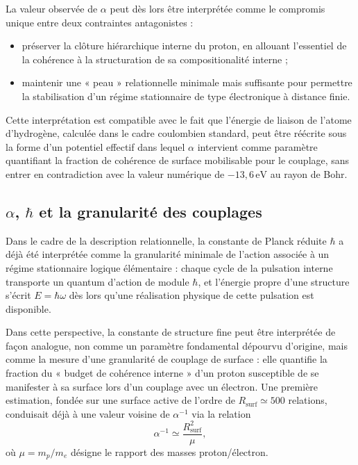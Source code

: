 \documentclass[11pt,a4paper]{article}
\begin{document}
La valeur observée de \(\alpha\) peut dès lors être interprétée comme le compromis unique entre deux contraintes antagonistes :
\begin{itemize}
  \item préserver la clôture hiérarchique interne du proton, en allouant l’essentiel de la cohérence à la structuration de sa compositionalité interne ;
  \item maintenir une « peau » relationnelle minimale mais suffisante pour permettre la stabilisation d’un régime stationnaire de type électronique à distance finie.
\end{itemize}

Cette interprétation est compatible avec le fait que l’énergie de liaison de l’atome d’hydrogène, calculée dans le cadre coulombien standard, peut être réécrite sous la forme d’un potentiel effectif dans lequel \(\alpha\) intervient comme paramètre quantifiant la fraction de cohérence de surface mobilisable pour le couplage, sans entrer en contradiction avec la valeur numérique de \(-13{,}6\,\mathrm{eV}\) au rayon de Bohr.

\subsection{\texorpdfstring{\(\alpha\), \(\hbar\)}{alpha, hbar} et la granularité des couplages}

Dans le cadre de la description relationnelle, la constante de Planck réduite \(\hbar\) a déjà été interprétée comme la granularité minimale de l’action associée à un régime stationnaire logique élémentaire : chaque cycle de la pulsation interne transporte un quantum d’action de module \(\hbar\), et l’énergie propre d’une structure s’écrit \(E = \hbar \omega\) dès lors qu’une réalisation physique de cette pulsation est disponible.

Dans cette perspective, la constante de structure fine peut être interprétée de façon analogue, non comme un paramètre fondamental dépourvu d’origine, mais comme la mesure d’une granularité de couplage de surface : elle quantifie la fraction du « budget de cohérence interne » d’un proton susceptible de se manifester à sa surface lors d’un couplage avec un électron. Une première estimation, fondée sur une surface active de l’ordre de \(R_{\mathrm{surf}} \simeq 500\) relations, conduisait déjà à une valeur voisine de \(\alpha^{-1}\) via la relation
\[
\alpha^{-1} \simeq \frac{R_{\mathrm{surf}}^{2}}{\mu},
\]
où \(\mu = m_p/m_e\) désigne le rapport des masses proton/électron.
\end{document}

